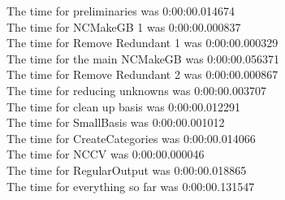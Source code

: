 \documentclass[rep10,leqno]{report}
\begin{document}
\noindent
The time for preliminaries was 0:00:00.014674\\
The time for NCMakeGB 1 was 0:00:00.000837\\
The time for Remove Redundant 1 was 0:00:00.000329\\
The time for the main NCMakeGB was 0:00:00.056371\\
The time for Remove Redundant 2 was 0:00:00.000867\\
The time for reducing unknowns was 0:00:00.003707\\
The time for clean up basis was 0:00:00.012291\\
The time for SmallBasis was 0:00:00.001012\\
The time for CreateCategories was 0:00:00.014066\\
The time for NCCV was 0:00:00.000046\\
The time for RegularOutput was 0:00:00.018865\\
The time for everything so far was 0:00:00.131547\\
\end{document}
